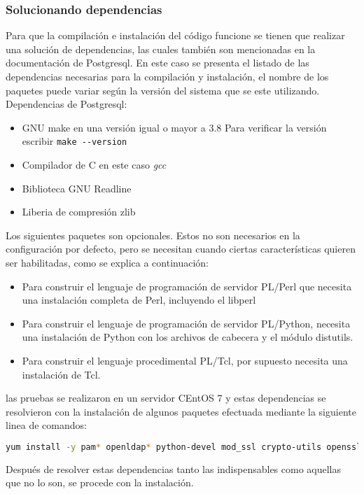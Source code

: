 \documentclass{article}
\begin{document}
\subsubsection{Solucionando dependencias}
Para que la compilación e instalación del código funcione se tienen que realizar una solución de dependencias, las cuales también son mencionadas en la documentación de Postgresql. En este caso se presenta el listado de las dependencias necesarias para la compilación y instalación, el nombre de los paquetes puede variar según la versión del sistema que se este utilizando. 
Dependencias de Postgresql:
\begin{itemize}
\item GNU make en una versión igual o mayor a 3.8
Para verificar la versión escribir \verb|make --version|
\item Compilador de C en este caso \textit{gcc}
\item Biblioteca GNU Readline 
\item Liberia de compresión zlib  
\end{itemize}
Los siguientes paquetes son opcionales. Estos no son necesarios en la configuración por defecto, pero se necesitan cuando ciertas características quieren ser habilitadas, como se explica a continuación:\\
\begin{itemize}
\item Para construir el lenguaje de programación de servidor PL/Perl que necesita una instalación completa de Perl, incluyendo el libperl
\item Para construir el lenguaje de programación de servidor PL/Python, necesita una instalación de Python con los archivos de cabecera y el módulo distutils.
\item Para construir el lenguaje procedimental PL/Tcl, por supuesto necesita una instalación de Tcl.
\end{itemize}
las pruebas se realizaron en un servidor CEntOS 7 y estas dependencias se resolvieron con la instalación de algunos paquetes efectuada mediante la siguiente linea de comandos:\\
\begin{lstlisting}[language=bash, frame=single]
yum install -y pam* openldap* python-devel mod_ssl crypto-utils openssl*
\end{lstlisting}
Después de resolver estas dependencias tanto las indispensables como aquellas que no lo son, se procede con la instalación.
\end{document}
